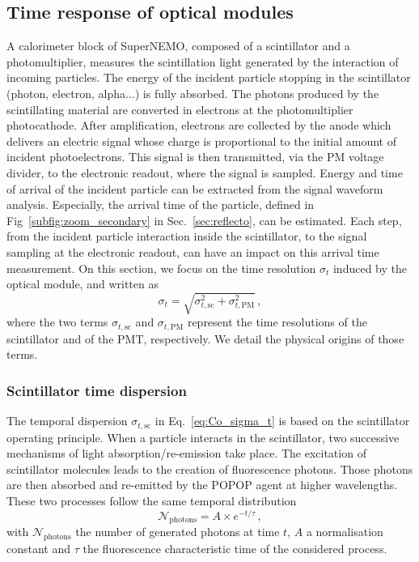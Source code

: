 \subsection{Time response of optical modules}
\label{sec:OMtimeResponse}

A calorimeter block of SuperNEMO, composed of a scintillator and a photomultiplier, measures the scintillation light generated by the interaction of incoming particles.
The energy of the incident particle stopping in the scintillator (photon, electron, alpha...) is fully absorbed.
The photons produced by the scintillating material are converted in electrons at the photomultiplier photocathode.
After amplification, electrons are collected by the anode which delivers an electric signal whose charge is proportional to the initial amount of incident photoelectrons.
This signal is then transmitted, via the PM voltage divider, to the electronic readout, where the signal is sampled.
Energy and time of arrival of the incident particle can be extracted from the signal waveform analysis.
Especially, the arrival time of the particle, defined in Fig~\ref{subfig:zoom_secondary} in Sec.~\ref{sec:reflecto}, can be estimated.
Each step, from the incident particle interaction inside the scintillator, to the signal sampling at the electronic readout, can have an impact on this arrival time measurement.
On this section, we focus on the time resolution $\sigma_{t}$ induced by the optical module, and written as
\begin{equation}
  \sigma_{t}=\sqrt{\sigma_{t,\text{sc}}^{2}+\sigma_{t,\text{PM}}^{2}}\,,
  \label{eq:Co_sigma_t}
\end{equation}
where the two terms $\sigma_{t,\text{sc}}$ and $\sigma_{t,\text{PM}}$ represent the time resolutions of the scintillator and of the PMT, respectively.
We detail the physical origins of those terms.

\subsubsection*{Scintillator time dispersion}
The temporal dispersion $\sigma_{t,\text{sc}}$ in Eq.~\eqref{eq:Co_sigma_t} is based on the  scintillator operating principle.
When a particle interacts in the scintillator, two successive mechanisms of light absorption/re-emission take place.
The excitation of scintillator molecules leads to the creation of fluorescence photons.
Those photons are then absorbed and re-emitted by the POPOP agent at higher wavelengths.
These two processes follow the same temporal distribution
\begin{equation}
\mathcal{N}_{\text{photons}} = A\times e^{-t/\tau}\,,
\label{eq:fluorescence_photons_time}
\end{equation}
with $\mathcal{N}_{\text{photons}}$ the number of generated photons at time $t$, $A$ a normalisation constant and $\tau$ the fluorescence characteristic time of the considered process.

